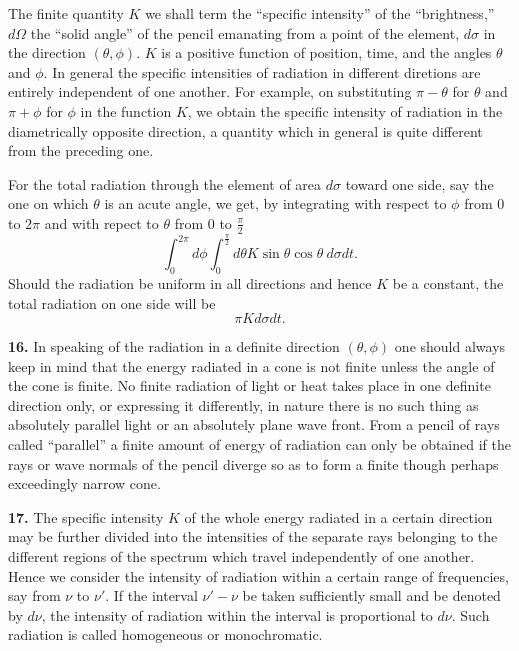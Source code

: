 \documentclass[12pt,oneside]{book}
\begin{document}
The finite quantity $K$ we shall term the ``specific intensity'' of the ``brightness,'' $d\Omega$ the ``solid angle'' of the pencil emanating from a point of the element, $d\sigma$ in the direction $(\theta,\phi)$. $K$ is a positive function of position, time, and the angles $\theta$ and $\phi$. In general the specific intensities of radiation in different diretions are entirely independent of one another. For example, on substituting $\pi - \theta$ for $\theta$ and $\pi + \phi$ for $\phi$ in the function $K$, we obtain the specific intensity of radiation in the diametrically opposite direction, a quantity which in general is quite different from the preceding one. \par 

For the total radiation through the element of area $d\sigma$ toward one side, say the one on which $\theta$ is an acute angle, we get, by integrating with respect to $\phi$ from 0 to $2\pi$ and with repect to $\theta$ from 0 to $\frac{\pi}{2}$ 
$$\int_0^{2\pi}d\phi\int_0^{\frac{\pi}{2}}d\theta K\sin\theta\cos\theta\ d\sigma dt.$$
Should the radiation be uniform in all directions and hence $K$ be a constant, the total radiation on one side will be 
\begin{equation}
    \label{eq7}
    \pi Kd\sigma dt.
\end{equation} \par 

\textbf{16.} In speaking of the radiation in a definite direction $(\theta,\phi)$ one should always keep in mind that the energy radiated in a cone is not finite unless the angle of the cone is finite. No finite radiation of light or heat takes place in one definite direction only, or expressing it differently, in nature there is no such thing as absolutely parallel light or an absolutely plane wave front. From a pencil of rays called ``parallel'' a finite amount of energy of radiation can only be obtained if the rays or wave normals of the pencil diverge so as to form a finite though perhaps exceedingly narrow cone. \par 

\textbf{17.} The specific intensity $K$ of the whole energy radiated in a certain direction may be further divided into the intensities of the separate rays belonging to the different regions of the spectrum which travel independently of one another. Hence we consider the intensity of radiation within a certain range of frequencies, say from $\nu$ to $\nu'$. If the interval $\nu'-\nu$ be taken sufficiently small and be denoted by $d\nu$, the intensity of radiation within the interval is proportional to $d\nu$. Such radiation is called homogeneous or monochromatic. \par 
\end{document}
